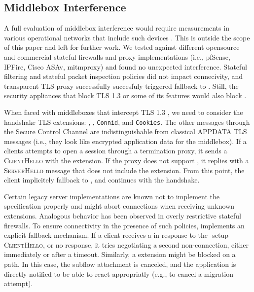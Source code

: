 \subsection{Middlebox Interference}
\label{sec:middlebox}

A full evaluation of middlebox interference would require measurements in various operational 
networks that include such devices \cite{honda2011still,raman2020measuring,o2016tls}. This is 
outside the scope of this paper and left for further work.
We tested \tcpls against different opensource and commercial stateful
firewalls and proxy implementations (i.e., pfSense, IPFire, Cisco ASAv,
mitmproxy) and found no unexpected interference. Stateful filtering and stateful
packet inspection policies did not impact connecivity, and transparent TLS proxy
successfully succesfuly triggered \tcpls fallback to \tcp \tls. Still, the security
appliances that block TLS 1.3 or some of its features 
\cite{lee2019matls,Bock_China,raman2020measuring} would also block \tcpls.


When faced with middleboxes that intercept TLS 1.3
\cite{Bock_China,raman2020measuring}, we need to consider the \tcpls handshake
TLS extensions: \tcpls, \join, \texttt{Connid}, and \texttt{Cookies}. The other
\tcpls messages through the Secure Control Channel are indistinguishable from
classical APPDATA TLS messages (i.e., they look like encrypted application data
for the middlebox). If a clients attempts to open a \tcpls session
through a \tls termination proxy, it sends a \textsc{ClientHello} with the
\tcpls extension.  If the proxy does not support \tcpls, it replies with a
\textsc{ServerHello} message that does not include the \tcpls extension. From
this point, the client implicitely fallback to \tls, and continues with the
handshake.

Certain legacy \tls server implementations are known not to implement the \tls
specification properly and might abort connections when receiving unknown \tls
extensions. Analogous behavior has been observed in overly restrictive stateful
firewalls. To ensure connectivity in the presence of such policies, \tcpls
implements an explicit fallback mechanism. If a client receives a \tcp \rst in
response to the \tcpls-setup \textsc{ClientHello}, or no response, it
tries negotiating a second non-\tcpls \tls connection, either
immediately or after a timeout. Similarly, a \tcpls \join extension might be
blocked on a path. In this case, the subflow attachment is canceled, and
the application is directly notified to be able to react appropriatly (e.g.,
to cancel a migration attempt).

